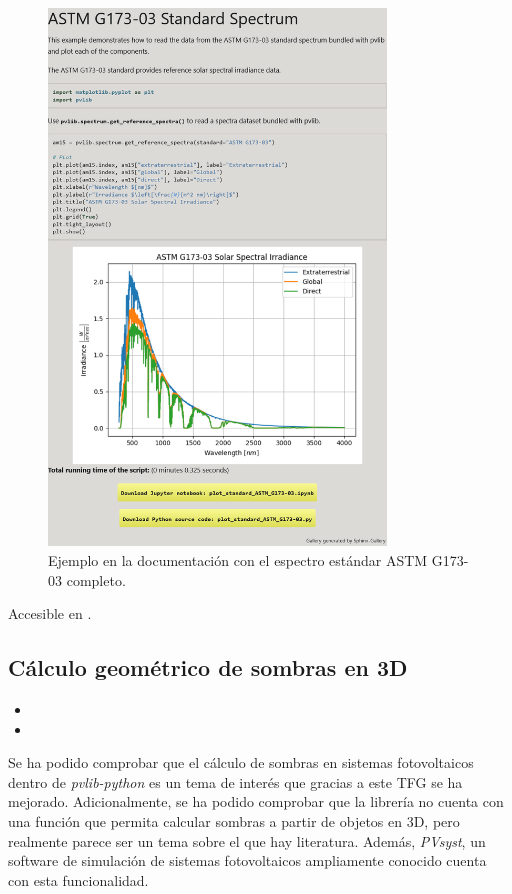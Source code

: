 \begin{figure}[H]
    \centering
    \includegraphics[width=0.8\textwidth]{./images/spectra/astm-g173-03.png}
    \caption{Ejemplo en la documentación con el espectro estándar ASTM G173-03 completo.}
    \label{fig:espectro_astm_g173-03}
\end{figure}

Accesible en .

\subsection{Cálculo geométrico de sombras en 3D}

\begin{itemize}
    \item {}
    \item {}
\end{itemize}

Se ha podido comprobar que el cálculo de sombras en sistemas fotovoltaicos dentro de \textit{pvlib-python} es un tema de interés que gracias a este TFG se ha mejorado. Adicionalmente, se ha podido comprobar que la librería no cuenta con una función que permita calcular sombras a partir de objetos en 3D, pero realmente parece ser un tema sobre el que hay literatura. Además, \textit{PVsyst}, un software de simulación de sistemas fotovoltaicos ampliamente conocido cuenta con esta funcionalidad.

